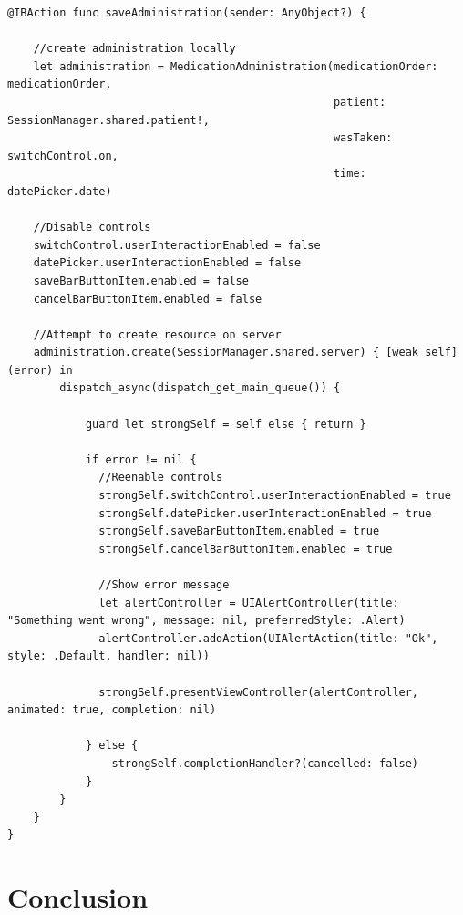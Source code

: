 \documentclass{article}
\begin{document}
\begin{verbatim}
@IBAction func saveAdministration(sender: AnyObject?) {

    //create administration locally
    let administration = MedicationAdministration(medicationOrder: medicationOrder,
                                                  patient: SessionManager.shared.patient!,
                                                  wasTaken: switchControl.on,
                                                  time: datePicker.date)

    //Disable controls
    switchControl.userInteractionEnabled = false
    datePicker.userInteractionEnabled = false
    saveBarButtonItem.enabled = false
    cancelBarButtonItem.enabled = false

    //Attempt to create resource on server
    administration.create(SessionManager.shared.server) { [weak self] (error) in
        dispatch_async(dispatch_get_main_queue()) {

            guard let strongSelf = self else { return }

            if error != nil {
              //Reenable controls
              strongSelf.switchControl.userInteractionEnabled = true
              strongSelf.datePicker.userInteractionEnabled = true
              strongSelf.saveBarButtonItem.enabled = true
              strongSelf.cancelBarButtonItem.enabled = true

              //Show error message
              let alertController = UIAlertController(title: "Something went wrong", message: nil, preferredStyle: .Alert)
              alertController.addAction(UIAlertAction(title: "Ok", style: .Default, handler: nil))

              strongSelf.presentViewController(alertController, animated: true, completion: nil)

            } else {
                strongSelf.completionHandler?(cancelled: false)
            }
        }
    }
}
\end{verbatim}

\section{Conclusion}





\end{document}
